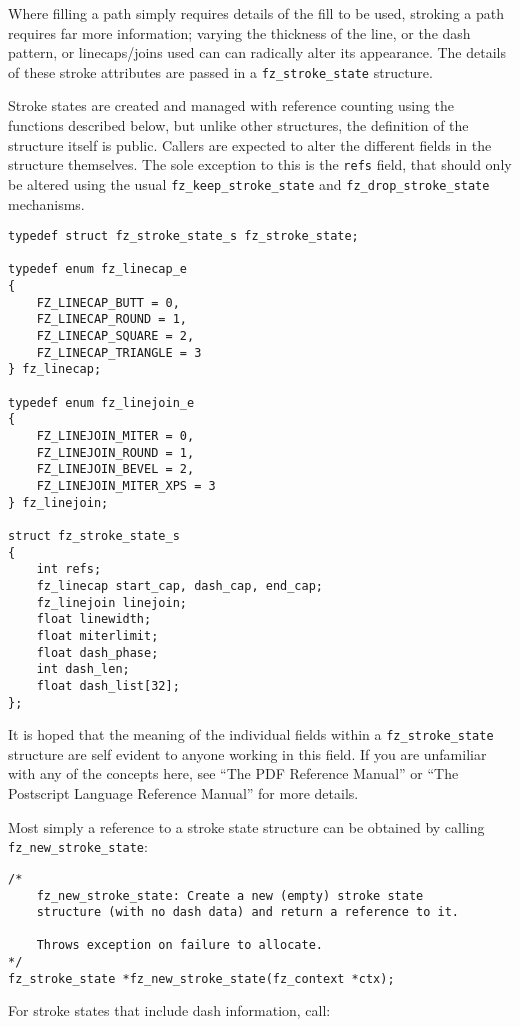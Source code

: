 \documentclass[oneside]{book}
\begin{document}
Where filling a path simply requires details of the fill to be used, stroking a path requires far more information; varying the thickness of the line, or the dash pattern, or linecaps/joins used can can radically alter its appearance. The details of these stroke attributes are passed in a \texttt{fz\_stroke\_state} structure.

Stroke states are created and managed with reference counting using the functions described below, but unlike other structures, the definition of the structure itself is public. Callers are expected to alter the different fields in the structure themselves. The sole exception to this is the \texttt{refs} field, that should only be altered using the usual \texttt{fz\_keep\_stroke\_state} and \texttt{fz\_drop\_stroke\_state} mechanisms.

\begin{lstlisting}
typedef struct fz_stroke_state_s fz_stroke_state;

typedef enum fz_linecap_e
{
	FZ_LINECAP_BUTT = 0,
	FZ_LINECAP_ROUND = 1,
	FZ_LINECAP_SQUARE = 2,
	FZ_LINECAP_TRIANGLE = 3
} fz_linecap;

typedef enum fz_linejoin_e
{
	FZ_LINEJOIN_MITER = 0,
	FZ_LINEJOIN_ROUND = 1,
	FZ_LINEJOIN_BEVEL = 2,
	FZ_LINEJOIN_MITER_XPS = 3
} fz_linejoin;

struct fz_stroke_state_s
{
	int refs;
	fz_linecap start_cap, dash_cap, end_cap;
	fz_linejoin linejoin;
	float linewidth;
	float miterlimit;
	float dash_phase;
	int dash_len;
	float dash_list[32];
};
\end{lstlisting}

It is hoped that the meaning of the individual fields within a \texttt{fz\_stroke\_state} structure are self evident to anyone working in this field. If you are unfamiliar with any of the concepts here, see
``The PDF Reference Manual'' or ``The Postscript Language Reference Manual'' for more details.

Most simply a reference to a stroke state structure can be obtained by calling \texttt{fz\_new\_stroke\_state}:

\begin{lstlisting}
/*
	fz_new_stroke_state: Create a new (empty) stroke state
	structure (with no dash data) and return a reference to it.

	Throws exception on failure to allocate.
*/
fz_stroke_state *fz_new_stroke_state(fz_context *ctx);
\end{lstlisting}

For stroke states that include dash information, call:
\end{document}
